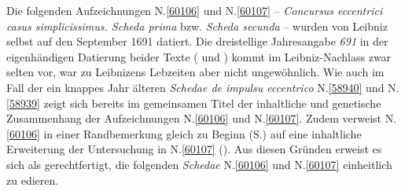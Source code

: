\footnotesize%
\pstart%
\noindent%
Die folgenden Aufzeichnungen N.\;\ref{60106} und N.\;\ref{60107} -- \textit{Concursus eccentrici casus simplicissimus. Scheda prima} bzw. \textit{Scheda secunda} -- wurden von Leibniz selbst auf den September 1691 datiert.
Die dreistellige Jahresangabe \textit{691} in der eigenhändigen Datierung beider Texte ( und ) kommt im Leibniz-Nachlass zwar selten vor, war zu Leibnizens Lebzeiten aber nicht ungewöhnlich.
Wie auch im Fall der ein knappes Jahr älteren \textit{Schedae de impulsu eccentrico} N.\;\ref{58940} und N.\;\ref{58939} zeigt sich bereits im gemeinsamen Titel der inhaltliche und genetische Zusammenhang der Aufzeichnungen N.\;\ref{60106} und N.\;\ref{60107}.
Zudem verweist N.\;\ref{60106} in einer Randbemerkung gleich zu Beginn (S.\;\pageref{LH_35_10_13_007r_rndbmrk_1}) auf eine inhaltliche Erweiterung der Untersuchung in N.\;\ref{60107} ().
Aus diesen Gründen erweist es sich als gerechtfertigt, die folgenden \textit{Schedae} N.\;\ref{60106} und N.\;\ref{60107} einheitlich zu edieren.
\pend%
%
\frenchspacing%
\normalsize%
\newpage %

